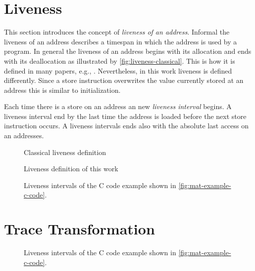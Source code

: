 \documentclass[onecolumn, openany, master, english, seal, signatures]{dbrgrptt}
\begin{document}
\section{Liveness}\label{sec:liveness}

This section introduces the concept of \emph{liveness of an address}. Informal the liveness of an address describes a timespan in which the address is used by a program. In general the liveness of an address begins with its allocation and ends with its deallocation as illustrated by \autoref{fig:liveness-classical}. This is how it is defined in many papers, e.g., \cite{aigner2013acdc}. Nevertheless, in this work liveness is defined differently. Since a store instruction overwrites the value currently stored at an address this is similar to  initialization.

\begin{definition}
Each time there is a store on an address an new \emph{liveness interval} begins. A liveness interval end by the last time the address is loaded before the next store instruction occurs. A liveness intervals ends also with the absolute last access on an addresses.
\end{definition}

\begin{figure}[h!]
  \centering
  
  \caption{Classical liveness definition}
  \label{fig:liveness-classical}
\end{figure}

\begin{figure}[h!]
  \centering
  
  \caption{Liveness definition of this work}
  \label{fig:liveness}
\end{figure}


\begin{figure}[h!]
  \centering
  
  \caption{Liveness intervals of the C code example shown in \autoref{fig:mat-example-c-code}.}
  \label{fig:liveness-intervals-example}
\end{figure}


\section{Trace Transformation}\label{sec:trace-transformation}

\begin{figure}[h!]
  \centering
  
  \caption{Liveness intervals of the C code example shown in \autoref{fig:mat-example-c-code}.}
  \label{fig:liveness}
\end{figure}
\end{document}
